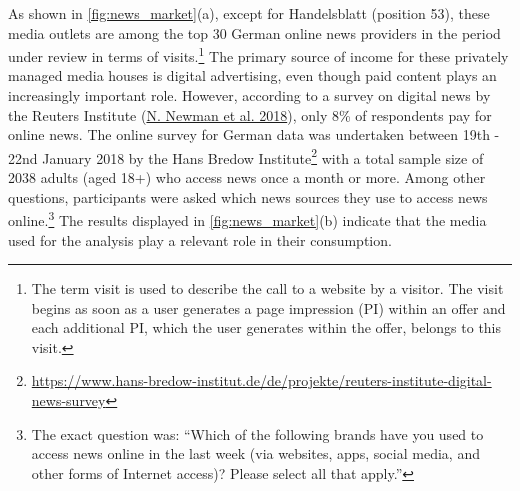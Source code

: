 \documentclass[
  12pt,
]{article}
\begin{document}
As shown in \autoref{fig:news_market}(a), except for Handelsblatt
(position 53), these media outlets are among the top 30 German online
news providers in the period under review in terms of visits.\footnote{The
  term visit is used to describe the call to a website by a visitor. The
  visit begins as soon as a user generates a page impression (PI) within
  an offer and each additional PI, which the user generates within the
  offer, belongs to this visit.} The primary source of income for these
privately managed media houses is digital advertising, even though paid
content plays an increasingly important role. However, according to a
survey on digital news by the Reuters Institute
(\protect\hyperlink{ref-newman_reuters_2018}{N. Newman et al. 2018}),
only 8\% of respondents pay for online news. The online survey for
German data was undertaken between 19th - 22nd January 2018 by the Hans
Bredow Institute\footnote{\url{https://www.hans-bredow-institut.de/de/projekte/reuters-institute-digital-news-survey}}
with a total sample size of 2038 adults (aged 18+) who access news once
a month or more. Among other questions, participants were asked which
news sources they use to access news online.\footnote{The exact question
  was: ``Which of the following brands have you used to access news
  online in the last week (via websites, apps, social media, and other
  forms of Internet access)? Please select all that apply.''} The
results displayed in \autoref{fig:news_market}(b) indicate that the
media used for the analysis play a relevant role in their consumption.
\end{document}
